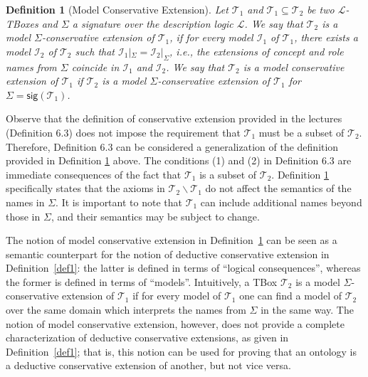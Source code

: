 \documentclass[12pt,a4paper]{article}
\newtheorem{definition}{Definition}
\newcommand{\sig}{\textsf{sig}\xspace}
\newenvironment{problems}[2][{\color{purple}Question}]{\begin{trivlist}
\item[\hskip \labelsep {\bfseries #1}\hskip \labelsep {\bfseries #2.}]}{\end{trivlist}}
\begin{document}
\begin{problems}{{\color{purple}6 (with 1 bonus mark)}}
\begin{definition}[Model Conservative Extension]
Let $\mathcal{T}_{1}$ and $\mathcal{T}_{1}\subseteq\mathcal{T}_{2}$ be two $\mathcal{L}$-TBoxes and $\Sigma$ a signature over the description logic $\mathcal{L}$. We say that $\mathcal{T}_{2}$ is a \emph{model $\Sigma$-conservative extension} of $\mathcal{T}_{1}$, if for every model $\mathcal{I}_{1}$ of $\mathcal{T}_{1}$, there exists a model $\mathcal{I}_{2}$ of $\mathcal{T}_{2}$ such that $\mathcal{I}_{1}|_{\Sigma}=\mathcal{I}_{2}|_{\Sigma}$, i.e., the extensions of concept and role names from $\Sigma$ coincide in $\mathcal{I}_{1}$ and $\mathcal{I}_{2}$. We say that $\mathcal{T}_{2}$ is a model conservative extension of $\mathcal{T}_{1}$ if $\mathcal{T}_{2}$ is a model $\Sigma$-conservative extension of $\mathcal{T}_{1}$ for $\Sigma=\sig(\mathcal{T}_{1})$.
\label{def3}
\end{definition}Observe that the definition of conservative extension provided in the lectures (Definition $6.3$) does not impose the requirement that $\mathcal{T}_{1}$ must be a subset of $\mathcal{T}_{2}$. Therefore, Definition $6.3$ can be considered a generalization of the definition provided in Definition \ref{def3} above. The conditions (1) and (2) in Definition 6.3 are immediate consequences of the fact that $\mathcal{T}_{1}$ is a subset of $\mathcal{T}_{2}$. Definition \ref{def3} specifically states that the axioms in $\mathcal{T}_{2}\backslash\mathcal{T}_{1}$ do not affect the semantics of the names in $\Sigma$. It is important to note that $\mathcal{T}_{1}$ can include additional names beyond those in $\Sigma$, and their semantics may be subject to change.

The notion of model conservative extension in Definition~\ref{def3} can be seen as a semantic counterpart for the notion of deductive conservative extension in Definition~\ref{def1}: the latter is defined in terms of ``logical consequences'', whereas the former is defined in terms of ``models''. Intuitively, a TBox $\mathcal{T}_{2}$ is a model $\Sigma$-conservative extension of $\mathcal{T}_{1}$ if for every model of $\mathcal{T}_{1}$ one can find a model of $\mathcal{T}_{2}$ over the same domain which interprets the names from $\Sigma$ in the same way. The notion of model conservative extension, however, does not provide a complete characterization of deductive conservative extensions, as given in Definition~\ref{def1}; that is, this notion can be used for proving that an ontology is a deductive conservative extension of another, but not vice versa.


\end{problems}
\end{document}
